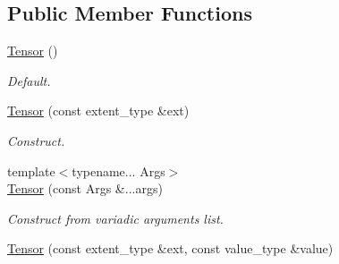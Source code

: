 \subsection*{Public Member Functions}
\begin{DoxyCompactItemize}
\item 
\hypertarget{classbtas_1_1_tensor_3_01_t_00_010ul_00_01_order_01_4_a909711ed9ee30fd1aa43309ecd912af2}{
\hyperlink{classbtas_1_1_tensor_3_01_t_00_010ul_00_01_order_01_4_a909711ed9ee30fd1aa43309ecd912af2}{Tensor} ()}
\label{classbtas_1_1_tensor_3_01_t_00_010ul_00_01_order_01_4_a909711ed9ee30fd1aa43309ecd912af2}

\begin{DoxyCompactList}\small\item\em Default. \item\end{DoxyCompactList}\item 
\hypertarget{classbtas_1_1_tensor_3_01_t_00_010ul_00_01_order_01_4_a29cb023b291270cb5bad5ba07df780c8}{
\hyperlink{classbtas_1_1_tensor_3_01_t_00_010ul_00_01_order_01_4_a29cb023b291270cb5bad5ba07df780c8}{Tensor} (const extent\_\-type \&ext)}
\label{classbtas_1_1_tensor_3_01_t_00_010ul_00_01_order_01_4_a29cb023b291270cb5bad5ba07df780c8}

\begin{DoxyCompactList}\small\item\em Construct. \item\end{DoxyCompactList}\item 
\hypertarget{classbtas_1_1_tensor_3_01_t_00_010ul_00_01_order_01_4_ad4bf5e874b8ffa605b890d89e68f7489}{
{\footnotesize template$<$typename... Args$>$ }\\\hyperlink{classbtas_1_1_tensor_3_01_t_00_010ul_00_01_order_01_4_ad4bf5e874b8ffa605b890d89e68f7489}{Tensor} (const Args \&...args)}
\label{classbtas_1_1_tensor_3_01_t_00_010ul_00_01_order_01_4_ad4bf5e874b8ffa605b890d89e68f7489}

\begin{DoxyCompactList}\small\item\em Construct from variadic arguments list. \item\end{DoxyCompactList}\item 
\hypertarget{classbtas_1_1_tensor_3_01_t_00_010ul_00_01_order_01_4_a9a617d289b34d1c8df88cbeb62726a1b}{
\hyperlink{classbtas_1_1_tensor_3_01_t_00_010ul_00_01_order_01_4_a9a617d289b34d1c8df88cbeb62726a1b}{Tensor} (const extent\_\-type \&ext, const value\_\-type \&value)}
\label{classbtas_1_1_tensor_3_01_t_00_010ul_00_01_order_01_4_a9a617d289b34d1c8df88cbeb62726a1b}


\end{DoxyCompactItemize}
